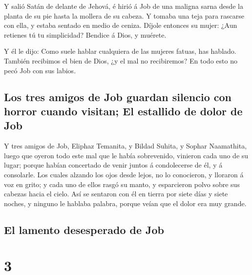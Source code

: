  Y salió Satán de delante de Jehová, é hirió á Job de una
maligna sarna desde la planta de su pie hasta la mollera de su cabeza.
 Y tomaba una teja para rascarse con ella, y estaba sentado
en medio de ceniza.  Díjole entonces su mujer: ¿Aun retienes
tú tu simplicidad? Bendice á Dios, y muérete.

 Y él le dijo: Como suele hablar cualquiera de las mujeres
fatuas, has hablado. También recibimos el bien de Dios, ¿y el mal no
recibiremos? En todo esto no pecó Job con sus labios.

\hypertarget{los-tres-amigos-de-job-guardan-silencio-con-horror-cuando-visitan-el-estallido-de-dolor-de-job}{%
\subsection{Los tres amigos de Job guardan silencio con horror cuando
visitan; El estallido de dolor de
Job}\label{los-tres-amigos-de-job-guardan-silencio-con-horror-cuando-visitan-el-estallido-de-dolor-de-job}}

 Y tres amigos de Job, Eliphaz Temanita, y Bildad Suhita, y
Sophar Naamathita, luego que oyeron todo este mal que le había
sobrevenido, vinieron cada uno de su lugar; porque habían concertado de
venir juntos á condolecerse de él, y á consolarle.  Los
cuales alzando los ojos desde lejos, no lo conocieron, y lloraron á voz
en grito; y cada uno de ellos rasgó su manto, y esparcieron polvo sobre
sus cabezas hacia el cielo.  Así se sentaron con él en
tierra por siete días y siete noches, y ninguno le hablaba palabra,
porque veían que el dolor era muy grande.

\hypertarget{el-lamento-desesperado-de-job}{%
\subsection{El lamento desesperado de
Job}\label{el-lamento-desesperado-de-job}}

\hypertarget{section-2}{%
\section{3}\label{section-2}}

